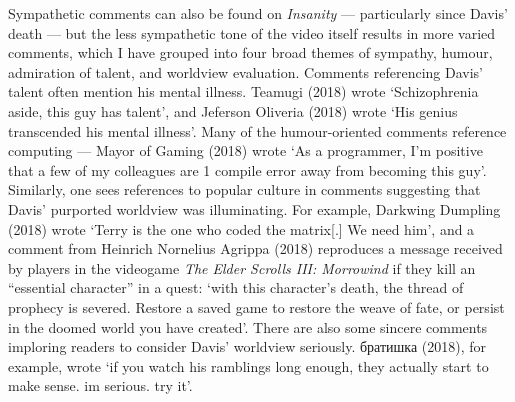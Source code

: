 \documentclass[Draft.tex]{subfiles}
\begin{document}

Sympathetic comments can also be found on \textit{Insanity} --- particularly
since Davis' death --- but the less sympathetic tone of the video itself
results in more varied comments,
which I have grouped into four broad themes of sympathy, humour,
admiration of talent, and worldview evaluation.
Comments referencing Davis' talent often mention his mental illness.
Teamugi (2018) wrote `Schizophrenia aside, this guy has talent', and
Jeferson Oliveria (2018) wrote `His genius transcended his mental illness'.
Many of the humour-oriented comments reference computing ---
Mayor of Gaming (2018) wrote `As a programmer, I'm positive that
a few of my colleagues are 1 compile error away from becoming this guy'.
Similarly, one sees references to popular culture in comments suggesting
that Davis' purported worldview was illuminating.
For example, Darkwing Dumpling (2018) wrote
`Terry is the one who coded the matrix[.] We need him',
and a comment from Heinrich Nornelius Agrippa (2018)
reproduces a message received by players in the videogame
\textit{The Elder Scrolls III: Morrowind} if they kill an
``essential character'' in a quest:
`with this character's death,
the thread of prophecy is severed.
Restore a saved game to restore the weave of fate,
or persist in the doomed world you have created'.
There are also some sincere comments imploring readers to
consider Davis' worldview seriously.
\foreignlanguage{russian}{братишка} (2018), for example, wrote
`if you watch his ramblings long enough,
they actually start to make sense. im serious. try it'.
\end{document}
